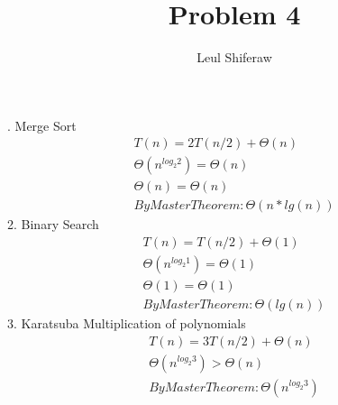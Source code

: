 \documentclass{article}
\title{Problem 4}
\author{Leul Shiferaw}
\begin{document}
	\maketitle
	. Merge Sort
	\begin{align*}	
		T(n)=2T(n/2)+\Theta(n)\\
		\Theta(n^{log_{2}2}) = \Theta(n)\\
		\Theta(n)=\Theta(n)\\
		By Master Theorem: \Theta(n*lg(n))	
	\end{align*}
	2. Binary Search
	\begin{align*}
		T(n)=T(n/2)+\Theta(1)\\
		\Theta(n^{log_{2}1})=\Theta(1)\\
		\Theta(1)=\Theta(1)\\
		ByMasterTheorem: \Theta(lg(n))		
	\end{align*}
	3. Karatsuba Multiplication of polynomials
	\begin{align*}
		T(n)=3T(n/2)+\Theta(n)\\
		\Theta(n^{log_{2}3})>\Theta(n)\\
		ByMasterTheorem: \Theta(n^{log_{2}3})
	\end{align*}
\end{document}
